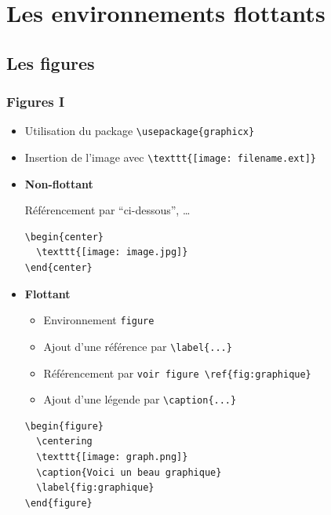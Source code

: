 \section{Les environnements flottants}
\subsection{Les figures}

\begin{frame}[fragile]
  \frametitle{Figures I}
  \begin{itemize}

  \item Utilisation du package \lstinline|\usepackage{graphicx}|
  \item Insertion de l'image avec \lstinline|\texttt{[image: filename.ext]}|

  \item \textbf{Non-flottant}

    Référencement par ``ci-dessous'', \dots
    \begin{lstlisting}[style=nonumbers]
\begin{center}
  \texttt{[image: image.jpg]}
\end{center}
    \end{lstlisting}

  \item \textbf{Flottant}
      \begin{itemize}
          \item Environnement \lstinline|figure|
          \item Ajout d'une référence par \lstinline|\label{...}|
        \item Référencement par \lstinline|voir figure \ref{fig:graphique}|
        \item Ajout d'une légende par \lstinline|\caption{...}|
    \end{itemize}
    \begin{lstlisting}[style=nonumbers]
\begin{figure}
  \centering
  \texttt{[image: graph.png]}
  \caption{Voici un beau graphique}
  \label{fig:graphique}
\end{figure}
    \end{lstlisting}
\end{itemize}
\end{frame}

